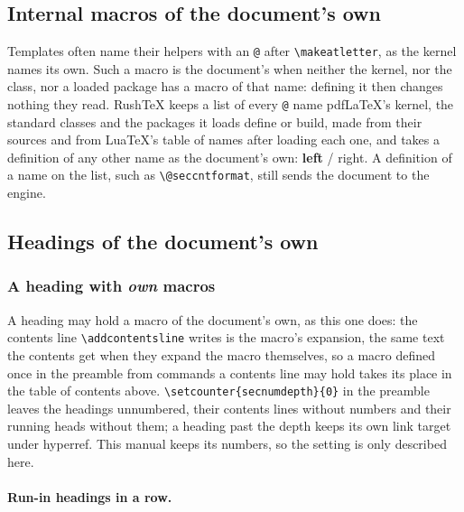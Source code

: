 \documentclass{article}
\numberwithin{equation}{section}
\newcommand{\rtword}[1]{\textit{#1}}
\theoremstyle{definition}
\theoremstyle{remark}
\begin{document}
\subsection{Internal macros of the document's own}\label{sec:ownat}
\makeatletter
\newcommand{\bk@strong}[1]{\textbf{#1}}\def\bk@sep{ / }%
\newcommand{\bkpair}[2]{\bk@strong{#1}\bk@sep#2}%
\makeatother
Templates often name their helpers with an \verb|@| after \verb|\makeatletter|, as the
kernel names its own. Such a macro is the document's when neither the kernel, nor the
class, nor a loaded package has a macro of that name: defining it then changes nothing
they read. RushTeX keeps a list of every \verb|@| name pdfLaTeX's kernel, the standard
classes and the packages it loads define or build, made from their sources and from
Lua\TeX's table of names after loading each one, and takes a definition of any other
name as the document's own: \bkpair{left}{right}. A definition of a name on the list,
such as \verb|\@seccntformat|, still sends the document to the engine.

\subsection{Headings of the document's own}\label{sec:ownheads}
\subsubsection{A heading with \rtword{own} macros}
A heading may hold a macro of the document's own, as this one does: the contents line
\verb|\addcontentsline| writes is the macro's expansion, the same text the contents get
when they expand the macro themselves, so a macro defined once in the preamble from
commands a contents line may hold takes its place in the table of contents above.
\verb|\setcounter{secnumdepth}{0}| in the preamble leaves the headings unnumbered, their
contents lines without numbers and their running heads without them; a heading past the
depth keeps its own link target under hyperref. This manual keeps its numbers, so the
setting is only described here.
\paragraph{Run-in headings in a row.}
\end{document}
